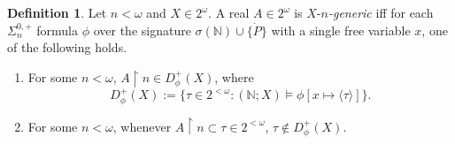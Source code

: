 \documentclass[12pt, twoside]{memoir}
\numberwithin{equation}{section}
\theoremstyle{definition}
\newtheorem{defi}[thm]{Definition}
\theoremstyle{remark}
\theoremstyle{definition}
\theoremstyle{definition}
\theoremstyle{definition}
\theoremstyle{remark}
\begin{document}
\begin{defi}
Let $n < \omega$ and $X \in 2^{\omega}$. A real $A \in 2^{\omega}$ is $X$-$n$\emph{-generic} iff for each $\Sigma^{0, +}_n$ formula $\phi$ over the signature $\sigma(\mathbb{N}) \cup \{\dot{P}\}$ with a single free variable $x$, one of the following holds.
\begin{enumerate}[label=(\alph*)]
    \item For some $n < \omega$, $A \restriction n \in D^+_{\phi}(X)$, where $$D^+_{\phi}(X) := \{\tau \in 2^{< \omega} : (\mathbb{N}; X) \models \phi[x \mapsto \langle \tau \rangle]\} \text{.}$$
    \item For some $n < \omega$, whenever $A \restriction n \subset \tau \in 2^{< \omega}$, $\tau \not\in D^+_{\phi}(X)$.
\end{enumerate}
\end{defi}
\end{document}
